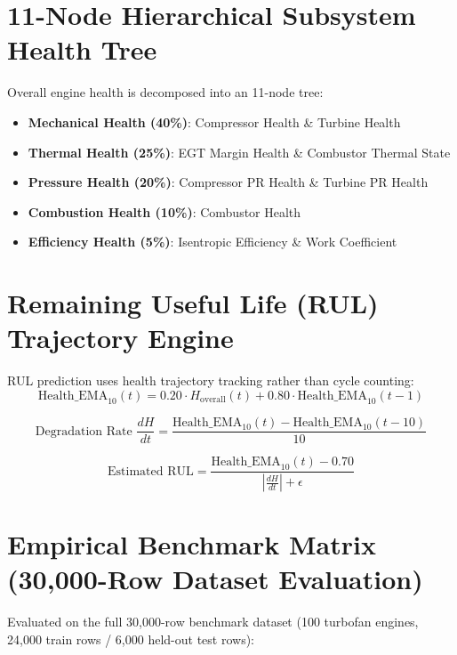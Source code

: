 \documentclass[11pt,a4paper]{article}
\begin{document}
\section{11-Node Hierarchical Subsystem Health Tree}
Overall engine health is decomposed into an 11-node tree:
\begin{itemize}
    \item \textbf{Mechanical Health (40\%)}: Compressor Health \& Turbine Health
    \item \textbf{Thermal Health (25\%)}: EGT Margin Health \& Combustor Thermal State
    \item \textbf{Pressure Health (20\%)}: Compressor PR Health \& Turbine PR Health
    \item \textbf{Combustion Health (10\%)}: Combustor Health
    \item \textbf{Efficiency Health (5\%)}: Isentropic Efficiency \& Work Coefficient
\end{itemize}

\section{Remaining Useful Life (RUL) Trajectory Engine}
RUL prediction uses health trajectory tracking rather than cycle counting:
\begin{equation}
\text{Health\_EMA}_{10}(t) = 0.20 \cdot H_{\text{overall}}(t) + 0.80 \cdot \text{Health\_EMA}_{10}(t-1)
\end{equation}

\begin{equation}
\text{Degradation Rate } \frac{dH}{dt} = \frac{\text{Health\_EMA}_{10}(t) - \text{Health\_EMA}_{10}(t-10)}{10}
\end{equation}

\begin{equation}
\text{Estimated RUL} = \frac{\text{Health\_EMA}_{10}(t) - 0.70}{\left| \frac{dH}{dt} \right| + \epsilon}
\end{equation}

\section{Empirical Benchmark Matrix (30,000-Row Dataset Evaluation)}
Evaluated on the full 30,000-row benchmark dataset (100 turbofan engines, 24,000 train rows / 6,000 held-out test rows):
\end{document}
